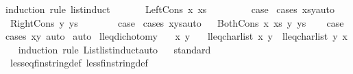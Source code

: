 \begin{isabellebody}
%
\isadelimproof
%
\endisadelimproof
%
\isatagproof
{}\isamarkupfalse%
{\isacharparenleft}induction\ rule{\isacharcolon}\ list{\isacharunderscore}induct{}{\isacharprime}{\isacharparenright}\isanewline
\ \ \ \ \ \isamarkupfalse%
\ {\isacharparenleft}LeftCons\ x\ xs{\isacharparenright}\ \ \ \ \ \ \isamarkupfalse%
\ \isamarkupfalse%
\ {\isacharquery}case\ \isamarkupfalse%
{\isacharparenleft}cases\ {\isachardoublequoteopen}xs{\isacharequal}y{\isachardoublequoteclose}{\isacharcomma}auto{\isacharparenright}\isanewline
{}\isamarkupfalse%
\ \isamarkupfalse%
\ {\isacharparenleft}RightCons\ y\ ys{\isacharparenright}\ \ \ \ \ \isamarkupfalse%
\ \isamarkupfalse%
\ {\isacharquery}case\ \isamarkupfalse%
{\isacharparenleft}cases\ {\isachardoublequoteopen}x{\isacharequal}ys{\isachardoublequoteclose}{\isacharcomma}auto{\isacharparenright}\isanewline
{}\isamarkupfalse%
\ \isamarkupfalse%
\ {\isacharparenleft}BothCons\ x\ xs\ y\ ys{\isacharparenright}\ \isamarkupfalse%
\ \isamarkupfalse%
\ {\isacharquery}case\ \isamarkupfalse%
{\isacharparenleft}cases\ {\isachardoublequoteopen}x{\isacharequal}y{\isachardoublequoteclose}{\isacharcomma}\ auto{\isacharparenright}\isanewline
{}\isamarkupfalse%
\ {\isacharparenleft}auto{\isacharparenright}%
\endisatagproof
{\isafoldproof}%
%
\isadelimproof
\isanewline
%
\endisadelimproof
\isanewline
{}\isamarkupfalse%
\ lleq{\isacharunderscore}dichotomy{\isacharcolon}\isanewline
\ \ \ x\ y\isanewline
\ \ \ {\isachardoublequoteopen}lleq{\isacharunderscore}charlist\ x\ y\ {\isasymor}\ lleq{\isacharunderscore}charlist\ y\ x{\isachardoublequoteclose}\isanewline
%
\isadelimproof
\ \ %
\endisadelimproof
%
\isatagproof
{}\isamarkupfalse%
{\isacharparenleft}induction\ rule{\isacharcolon}\ List{\isachardot}list{\isacharunderscore}induct{}{\isacharprime}{\isacharcomma}auto{\isacharparenright}%
\endisatagproof
{\isafoldproof}%
%
\isadelimproof
\isanewline
%
\endisadelimproof
\isanewline
{}\isamarkupfalse%
\isanewline
%
\isadelimproof
\ \ %
\endisadelimproof
%
\isatagproof
{}\isamarkupfalse%
{\isacharparenleft}standard{\isacharparenright}\isanewline
\ \ \ \ \ \ \isamarkupfalse%
\ less{\isacharunderscore}eq{\isacharunderscore}fin{\isacharunderscore}string{\isacharunderscore}def\ less{\isacharunderscore}fin{\isacharunderscore}string{\isacharunderscore}def\isanewline

\end{isabellebody}
